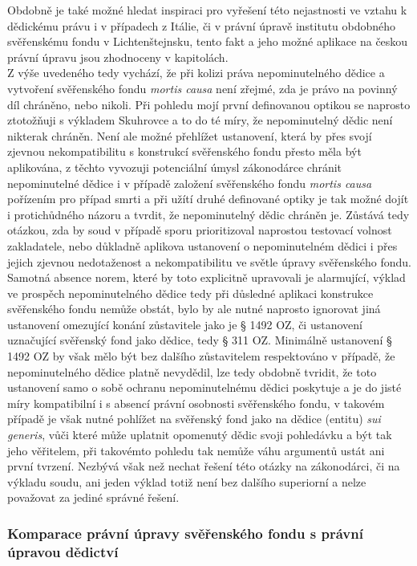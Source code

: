 \documentclass{article}
\begin{document}
Obdobně je také možné hledat inspiraci pro vyřešení této nejastnosti ve vztahu k dědickému právu i v případech z Itálie, či v právní úpravě institutu obdobného svěřenskému fondu v Lichtenštejnsku, tento fakt a jeho možné aplikace na českou právní úpravu jsou zhodnoceny v kapitolách. \\

Z výše uvedeného tedy vychází, že při kolizi práva nepominutelného dědice a vytvoření svěřenského fondu \textit{mortis causa} není zřejmé, zda je právo na povinný díl chráněno, nebo nikoli. Při pohledu mojí první definovanou optikou se naprosto ztotožňuji s výkladem Skuhrovce a to do té míry, že nepominutelný dědic není nikterak chráněn. Není ale možné přehlížet ustanovení, která by přes svojí zjevnou nekompatibilitu s konstrukcí svěřenského fondu přesto měla být aplikována, z těchto vyvozuji potenciální úmysl zákonodárce chránit nepominutelné dědice i v případě založení svěřenského fondu \textit{mortis causa} pořízením pro případ smrti a při užítí druhé definované optiky je tak možné dojít i protichůdného názoru a tvrdit, že nepominutelný dědic chráněn je. Zůstává tedy otázkou, zda by soud v případě sporu prioritizoval naprostou testovací volnost zakladatele, nebo důkladně aplikova ustanovení o nepominutelném dědici i přes jejich zjevnou nedotaženost a nekompatibilitu ve světle úpravy svěřenského fondu. Samotná absence norem, které by toto explicitně upravovali je alarmující, výklad ve prospěch nepominutelného dědice tedy při důsledné aplikaci konstrukce svěřenského fondu nemůže obstát, bylo by ale nutné naprosto ignorovat jiná ustanovení omezující konání zůstavitele jako je § 1492 OZ, či ustanovení uznačující svěřenský fond jako dědice, tedy § 311 OZ. Minimálně ustanovení § 1492 OZ by však mělo být bez dalšího zůstavitelem respektováno v případě, že nepominutelného dědice platně nevydědil, lze tedy obdobně tvridit, že toto ustanovení samo o sobě ochranu nepominutelnému dědici poskytuje a je do jisté míry kompatibilní i s absencí právní osobnosti svěřenského fondu, v takovém případě je však nutné pohlížet na svěřenský fond jako na dědice (entitu) \textit{sui generis}, vůči které může uplatnit opomenutý dědic svoji pohledávku a být tak jeho věřitelem, při takovémto pohledu tak nemůže váhu argumentů ustát ani první tvrzení. Nezbývá však než nechat řešení této otázky na zákonodárci, či na výkladu soudu, ani jeden výklad totiž není bez dalšího superiorní a nelze považovat za jediné správné řešení.\\

\subsubsection{Komparace právní úpravy svěřenského fondu s právní úpravou dědictví}
\end{document}
